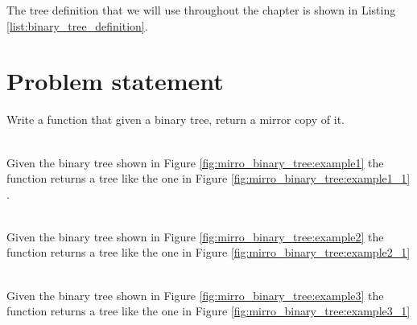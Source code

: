 The tree definition that we will use throughout the chapter is shown in Listing \ref{list:binary_tree_definition}.


\section{Problem statement}
\begin{exercise}
	Write a function that given a binary tree, return a mirror copy of it.

	\begin{example}
		\hfill \\
		Given the binary tree shown in Figure \ref{fig:mirro_binary_tree:example1} the function
		returns a tree like the one in Figure \ref{fig:mirro_binary_tree:example1_1}
		\label{ex:mirro_binary_tree:example1}.
	\end{example}

	\begin{example}
		\hfill \\
		Given the binary tree shown in Figure \ref{fig:mirro_binary_tree:example2} the function
		returns a tree like the one in Figure \ref{fig:mirro_binary_tree:example2_1}
		\label{ex:mirro_binary_tree:example2}
	\end{example}

	\begin{example}
		\hfill \\
		Given the binary tree shown in Figure \ref{fig:mirro_binary_tree:example3} the function
		returns a tree like the one in Figure \ref{fig:mirro_binary_tree:example3_1}
		\label{ex:mirro_binary_tree:example3}
	\end{example}
\end{exercise}


